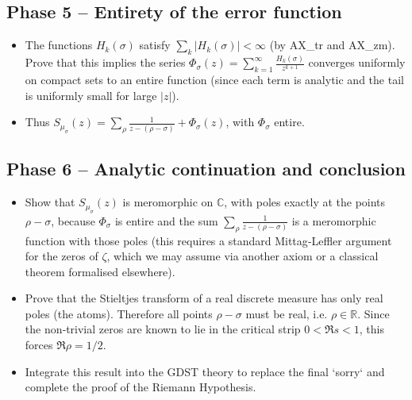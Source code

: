 \documentclass[12pt,a4paper]{article}
\begin{document}
\subsection{Phase 5 – Entirety of the error function}
\begin{itemize}
    \item The functions $H_k(\sigma)$ satisfy $\sum_{k} |H_k(\sigma)| < \infty$ (by 
          AX\_tr and AX\_zm).  Prove that this implies the series 
          $\Phi_\sigma(z) = \sum_{k=1}^\infty \frac{H_k(\sigma)}{z^{k+1}}$ converges 
          uniformly on compact sets to an entire function (since each term is analytic 
          and the tail is uniformly small for large $|z|$).
    \item Thus $S_{\mu_\sigma}(z) = \sum_{\rho} \frac{1}{z - (\rho-\sigma)} + \Phi_\sigma(z)$,
          with $\Phi_\sigma$ entire.
\end{itemize}

\subsection{Phase 6 – Analytic continuation and conclusion}
\begin{itemize}
    \item Show that $S_{\mu_\sigma}(z)$ is meromorphic on $\mathbb{C}$, with poles 
          exactly at the points $\rho-\sigma$, because $\Phi_\sigma$ is entire and the 
          sum $\sum_\rho \frac{1}{z - (\rho-\sigma)}$ is a meromorphic function with 
          those poles (this requires a standard Mittag‑Leffler argument for the zeros 
          of $\zeta$, which we may assume via another axiom or a classical theorem 
          formalised elsewhere).
    \item Prove that the Stieltjes transform of a real discrete measure has only real 
          poles (the atoms).  Therefore all points $\rho-\sigma$ must be real, i.e. 
          $\rho \in \mathbb{R}$.  Since the non‑trivial zeros are known to lie in the 
          critical strip $0<\Re s<1$, this forces $\Re \rho = 1/2$.
    \item Integrate this result into the GDST theory to replace the final `sorry` 
          and complete the proof of the Riemann Hypothesis.
\end{itemize}
\end{document}
